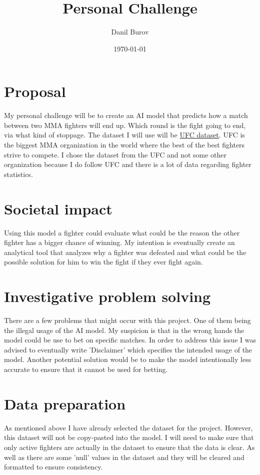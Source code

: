 \documentclass{article}
\title{Personal Challenge}
\author{Danil Burov}
\date{\today}
\begin{document}
\maketitle

\section{Proposal}

My personal challenge will be to create an AI model that predicts how a match between two
MMA fighters will end up. Which round is the fight going to end, via what kind of stoppage. 
The dataset I will use will be \href{https://www.kaggle.com/datasets/asaniczka/ufc-fighters-statistics}{UFC dataset}.
UFC is the biggest MMA organization in the world where the best of the best fighters strive to
compete. I chose the dataset from the UFC and not some other organization because I do follow UFC
and there is a lot of data regarding fighter statistics.

\section{Societal impact}
Using this model a fighter could evaluate what could be the reason the other fighter has a bigger
chance of winning. My intention is eventually create an analytical tool that analyzes why a fighter 
was defeated and what could be the possible solution for him to win the fight if they ever fight again.

\section{Investigative problem solving}
There are a few problems that might occur with this project. One of them being the illegal usage of the
AI model. My suspicion is that in the wrong hands the model could be use to bet on specific matches. In order 
to address this issue I was advised to eventually write 'Disclaimer' which specifies the intended usage of the model. 
Another potential solution would be to make the model intentionally less accurate to ensure that it cannot be used for betting.

\section{Data preparation}
As mentioned above I have already selected the dataset for the project. However, this dataset will not be copy-pasted into 
the model. I will need to make sure that only active fighters are actually in the dataset to ensure that the data is clear. 
As well as there are some 'null' values in the dataset and they will be cleared and formatted to ensure consistency.
\end{document}
